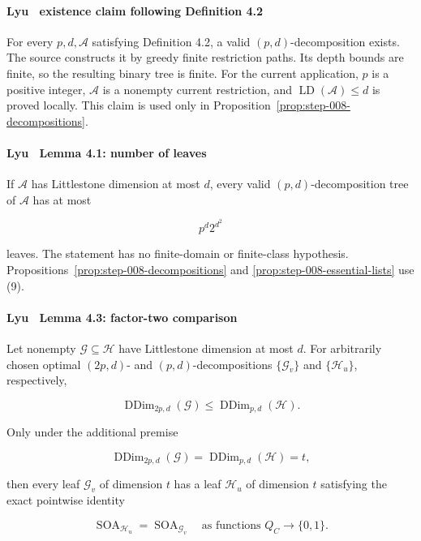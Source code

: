 \paragraph{Lyu~\citep{lyu2025} existence claim following Definition 4.2}

For every \(p,d,\mathcal A\) satisfying Definition 4.2, a valid
\((p,d)\)-decomposition exists. The source constructs it by greedy finite
restriction paths. Its depth bounds are finite, so the resulting binary
tree is finite. For the current application, \(p\) is a positive integer,
\(\mathcal A\) is a nonempty current restriction, and
\(\operatorname{LD}(\mathcal A)\le d\) is proved locally. This claim is
used only in Proposition~\ref{prop:step-008-decompositions}.

\paragraph{Lyu~\citep{lyu2025} Lemma 4.1: number of leaves}

If \(\mathcal A\) has Littlestone dimension at most \(d\), every valid
\((p,d)\)-decomposition tree of \(\mathcal A\) has at most

\[
 p^d2^{d^2}
\tag{9}
\]

leaves. The statement has no finite-domain or finite-class hypothesis.
Propositions~\ref{prop:step-008-decompositions} and
\ref{prop:step-008-essential-lists} use (9).

\paragraph{Lyu~\citep{lyu2025} Lemma 4.3: factor-two comparison}

Let nonempty \(\mathcal G\subseteq\mathcal H\) have Littlestone dimension
at most \(d\). For arbitrarily chosen optimal \((2p,d)\)- and
\((p,d)\)-decompositions \(\{\mathcal G_v\}\) and
\(\{\mathcal H_u\}\), respectively,

\[
 \operatorname{DDim}_{2p,d}(\mathcal G)
 \le \operatorname{DDim}_{p,d}(\mathcal H).
\tag{10}
\]

Only under the additional premise

\[
 \operatorname{DDim}_{2p,d}(\mathcal G)
 =\operatorname{DDim}_{p,d}(\mathcal H)=t,
\tag{11}
\]

then every leaf \(\mathcal G_v\) of dimension \(t\) has a leaf
\(\mathcal H_u\) of dimension \(t\) satisfying the exact pointwise
identity

\[
 \operatorname{SOA}_{\mathcal H_u}
 =\operatorname{SOA}_{\mathcal G_v}
 \quad\text{as functions }Q_C\to\{0,1\}.
\tag{12}
\]

